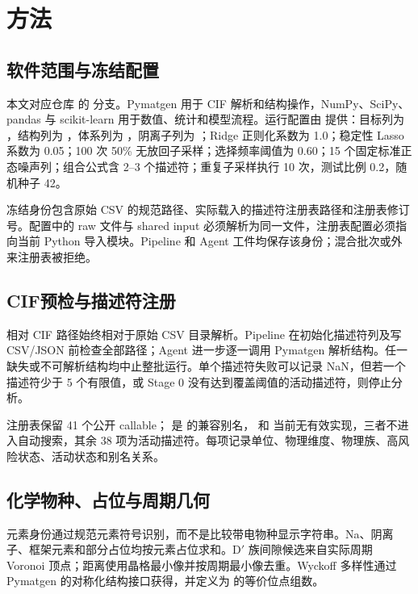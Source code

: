 \section{方法}

\subsection{软件范围与冻结配置}

本文对应仓库  的  分支。Pymatgen 用于 CIF 解析和结构操作，NumPy、SciPy、pandas 与 scikit-learn 用于数值、统计和模型流程\cite{Ong2013,Harris2020,Pedregosa2011}。运行配置由  提供：目标列为 ，结构列为 ，体系列为 ，阴离子列为 ；Ridge 正则化系数为 1.0；稳定性 Lasso 系数为 0.05；100 次 50\% 无放回子采样；选择频率阈值为 0.60；15 个固定标准正态噪声列；组合公式含 2--3 个描述符；重复子采样执行 10 次，测试比例 0.2，随机种子 42。

冻结身份包含原始 CSV 的规范路径、实际载入的描述符注册表路径和注册表修订号。配置中的 raw 文件与 shared input 必须解析为同一文件，注册表配置必须指向当前 Python 导入模块。Pipeline 和 Agent 工件均保存该身份；混合批次或外来注册表被拒绝。

\subsection{CIF预检与描述符注册}

相对 CIF 路径始终相对于原始 CSV 目录解析。Pipeline 在初始化描述符列及写 CSV/JSON 前检查全部路径；Agent 进一步逐一调用 Pymatgen 解析结构。任一缺失或不可解析结构均中止整批运行。单个描述符失败可以记录 NaN，但若一个描述符少于 5 个有限值，或 Stage 0 没有达到覆盖阈值的活动描述符，则停止分析。

注册表保留 41 个公开 callable； 是  的兼容别名， 和  当前无有效实现，三者不进入自动搜索，其余 38 项为活动描述符。每项记录单位、物理维度、物理族、高风险状态、活动状态和别名关系。

\subsection{化学物种、占位与周期几何}

元素身份通过规范元素符号识别，而不是比较带电物种显示字符串。Na、阴离子、框架元素和部分占位均按元素占位求和。D$'$ 族间隙候选来自实际周期 Voronoi 顶点；距离使用晶格最小像并按周期最小像去重。Wyckoff 多样性通过 Pymatgen 的对称化结构接口获得，并定义为  的等价位点组数。

